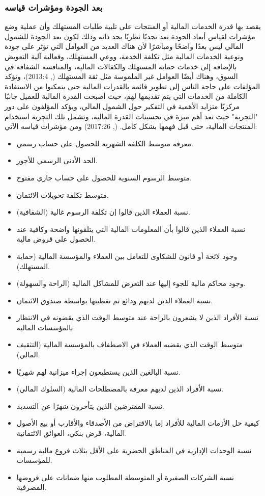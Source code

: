 \documentclass[10pt,a4paper]{report}
\begin{document}
\begin{doublespacing}
\subsubsection{بعد الجودة ومؤشرات قياسه}
يقصد بها قدرة الخدمات المالية أو المنتجات على تلبية طلبات المستهلك وأن عملية وضع مؤشرات لقياس أبعاد الجودة تعد تحديًا نظريًا بحد ذاته وذلك لكون بعد الجودة للشمول المالي ليس بعدًا واضحًا ومباشرًا لأن هناك العديد من العوامل التي تؤثر على جودة ونوعية الخدمات المالية مثل تكلفة الخدمة، ووعي المستهلك، وفعالية آلية التعويض بالإضافة إلى خدمات حماية المستهلك والكفالات المالية، والمنافسة الشفافة في السوق، وهناك أيضًا العوامل غير الملموسة مثل ثقة المستهلك (, 2013:4)، وتؤكد المؤلفات على حاجة الناس إلى تطوير قائمة بالقدرات المالية حتى يتمكنوا من الاستفادة الكاملة من الخدمات التي يتم تقديمها لهم، حيث أصبحت القدرة المالية للعميل جانبًا مركزيًا متزايد الأهمية في التفكير حول الشمول المالي، ويؤكد المؤلفون على دور "التجربة" حيث تعد أهم ميزة في تحسينات القدرة المالية، وتشمل تلك التجربة استخدام المنتجات المالية، حتى قبل فهمها بشكل كامل. (, 2017:26) ومن مؤشرات قياسه الآتي:
\begin{itemize}
	\item معرفة متوسط الكلفة الشهرية للحصول على حساب رسمي.
	\item الحد الأدنى الرسمي للأجور.
	\item متوسط الرسوم السنوية للحصول على حساب جاري مفتوح.
	\item متوسط تكلفة تحويلات الائتمان.
	\item نسبة العملاء الذين قالوا إن تكلفة الرسوم غالية (الشفافية).
	\item نسبة العملاء الذين قالوا بأن المعلومات المالية التي يتلقونها واضحة وكافية عند الحصول على قروض مالية.
	\item وجود لائحة أو قانون للشكاوى للتعامل بين العملاء والمؤسسة المالية (حماية المستهلك).
	\item وجود محاكم مالية للجوء إليها عند التعرض للمشاكل المالية (الراحة والسهولة).
	\item نسبة العملاء الذين لديهم ودائع تم تغطيتها بواسطة صندوق الائتمان.
	\item نسبة الأفراد الذين لا يشعرون بالراحة عند متوسط الوقت الذي يقضونه في الانتظار بالمؤسسات المالية.
	\item متوسط الوقت الذي يقضيه العملاء في الاصطفاف بالمؤسسة المالية (التثقيف المالي).
	\item نسبة البالغين الذين يستطيعون إجراء ميزانية لهم شهريًا.
	\item نسبة الأفراد الذين لديهم معرفة بالمصطلحات المالية (السلوك المالي).
	\item نسبة المقترضين الذين يتأخرون شهرًا عن التسديد.
	\item كيفية حل الأزمات المالية للأفراد إما بالاقتراض من الأصدقاء والأقارب أو بيع الأصول المالية، قرض بنكي، العوائق الائتمانية.
	\item نسبة الوحدات الإدارية في المناطق الحضرية على الأقل بثلاث فروع مالية رسمية للمؤسسات.
	\item نسبة الشركات الصغيرة أو المتوسطة المطلوب منها ضمانات على قروضها المصرفية.
\end{itemize}
\clearpage

\end{doublespacing}
\end{document}

